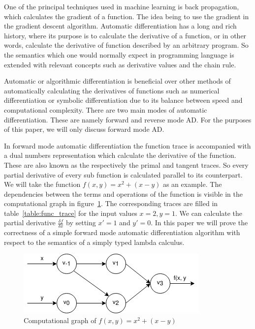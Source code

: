 \documentclass[12pt, final]{article}
\begin{document}

One of the principal techniques used in machine learning is back propagation, which calculates the gradient of a function.
The idea being to use the gradient in the gradient descent algorithm\cite{Baydin2015AutomaticDI}.
Automatic differentiation has a long and rich history, where its purpose is to calculate the derivative of a function, or in other words, calculate the derivative of function described by an arbitrary program.
So the semantics which one would normally expect in programming language is extended with relevant concepts such as derivative values and the chain rule.

Automatic or algorithmic differentiation is beneficial over other methods of automatically calculating the derivatives of functions such as numerical differentiation or symbolic differentiation due to its balance between speed and computational complexity.
There are two main modes of automatic differentiation.
These are namely forward and reverse mode AD. For the purposes of this paper, we will only discuss forward mode AD.

In forward mode automatic differentiation the function trace is accompanied with a dual numbers representation which calculate the derivative of the function. These are also known as the respectively the primal and tangent traces. So every partial derivative of every sub function is calculated parallel to its counterpart. We will take the function $f(x, y) = x^2 + (x - y)$ as an example. The dependencies between the terms and operations of the function is visible in the computational graph in figure~\ref{fig:func_trace}. The corresponding traces are filled in table~\ref{table:func_trace} for the input values $x = 2, y = 1$. We can calculate the partial derivative $\frac{\delta f}{\delta x}$ by setting $x' = 1$ and $y' = 0$. In this paper we will prove the correctness of a simple forward mode automatic differentiation algorithm with respect to the semantics of a simply typed lambda calculus.

\begin{figure}[h]
  \centering
  \includegraphics[scale=0.6]{assets/function_trace.png}
  \caption{Computational graph of $f(x, y) = x^2 + (x - y)$}
  \label{fig:func_trace}
\end{figure}
\end{document}
